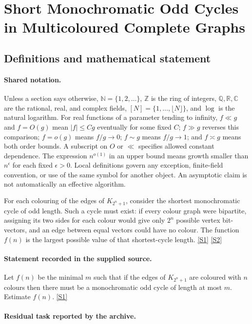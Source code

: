\documentclass[11pt,a4paper]{article}
\newcommand{\N}{\mathbb{N}}
\newcommand{\Z}{\mathbb{Z}}
\newcommand{\Q}{\mathbb{Q}}
\newcommand{\R}{\mathbb{R}}
\newcommand{\C}{\mathbb{C}}
\newcommand{\sref}[2]{\hyperlink{source:#1:#2}{[S#2]}}
\begin{document}
\section{Short Monochromatic Odd Cycles in Multicoloured Complete Graphs}\label{statement}


\subsection{Definitions and mathematical statement}

\paragraph{Shared notation.}Unless a section says otherwise, $\N=\{1,2,\ldots\}$,
$\Z$ is the ring of integers, $\Q,\R,\C$ are the rational, real, and complex
fields, $[N]=\{1,\ldots,\lfloor N\rfloor\}$, and $\log$ is the natural
logarithm. For real functions of a parameter tending to infinity,
$f\ll g$ and $f=O(g)$ mean $|f|\leq Cg$ eventually for some fixed $C$;
$f\gg g$ reverses this comparison; $f=o(g)$ means $f/g\to0$;
$f\sim g$ means $f/g\to1$; and $f\asymp g$ means both order bounds.
A subscript on $O$ or $\ll$ specifies allowed constant dependence.
The expression $n^{o(1)}$ in an upper bound means growth smaller than
$n^\epsilon$ for each fixed $\epsilon>0$. Local definitions govern any
exception, finite-field convention, or use of the same symbol for another
object. An asymptotic claim is not automatically an effective algorithm.



For each colouring of the edges of $K_{2^n+1}$, consider the shortest monochromatic cycle of odd length. Such a cycle must exist: if every colour graph were bipartite, assigning its two sides for each colour would give only $2^n$ possible vertex bit-vectors, and an edge between equal vectors could have no colour. The function $f(n)$ is the largest possible value of that shortest-cycle length. \sref{statement}{1} \sref{statement}{2}

\paragraph{Statement recorded in the supplied source.}
Let $f(n)$ be the minimal $m$ such that if the edges of $K_{2^n+1}$ are coloured with $n$ colours then there must be a monochromatic odd cycle of length at most $m$. Estimate $f(n)$. \sref{statement}{1}

\paragraph{Residual task reported by the archive.}
\end{document}

